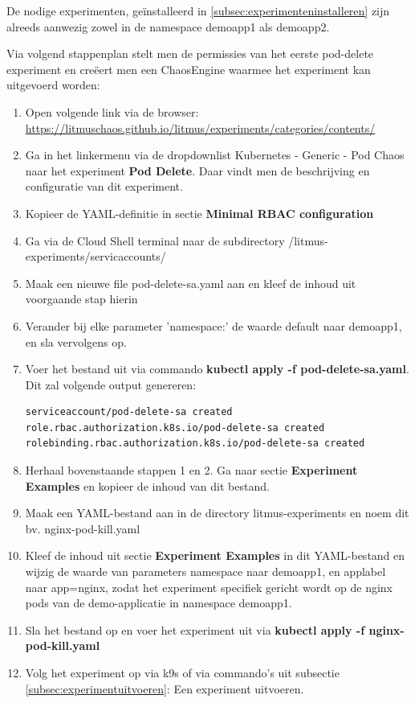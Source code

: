 De nodige experimenten, geïnstalleerd in \ref{subsec:experimenteninstalleren} zijn alreeds aanwezig zowel in de namespace demoapp1 als demoapp2.
  
Via volgend stappenplan stelt men de permissies van het eerste pod-delete experiment en creëert men een ChaosEngine waarmee het experiment kan uitgevoerd worden: 
\begin{enumerate}
    \item Open volgende link via de browser: \url{https://litmuschaos.github.io/litmus/experiments/categories/contents/} 
    \item Ga in het linkermenu via de dropdownlist Kubernetes - Generic - Pod Chaos naar het experiment {\bf Pod Delete}. Daar vindt men de beschrijving en configuratie van dit experiment.
    \item Kopieer de YAML-definitie in sectie {\bf Minimal RBAC configuration}
    \item Ga via de Cloud Shell terminal naar de subdirectory /litmus-experiments/servicaccounts/
    \item Maak een nieuwe file pod-delete-sa.yaml aan en kleef de inhoud uit voorgaande stap hierin
    \item Verander bij elke parameter 'namespace:' de waarde default naar demoapp1, en sla vervolgens op.
    \item Voer het bestand uit via commando {\bf kubectl apply -f pod-delete-sa.yaml}. Dit zal volgende output genereren:
\begin{lstlisting}[language=bash]    
serviceaccount/pod-delete-sa created
role.rbac.authorization.k8s.io/pod-delete-sa created
rolebinding.rbac.authorization.k8s.io/pod-delete-sa created
\end{lstlisting}
    \item Herhaal bovenstaande stappen 1 en 2. Ga naar sectie {\bf Experiment Examples} en kopieer de inhoud van dit bestand.
    \item Maak een YAML-bestand aan in de directory litmus-experiments en noem dit bv. nginx-pod-kill.yaml
    \item Kleef de inhoud uit sectie {\bf Experiment Examples} in dit YAML-bestand en wijzig  de waarde van parameters namespace naar demoapp1, en applabel naar app=nginx, zodat het experiment specifiek gericht wordt op de nginx pods van de demo-applicatie in namespace demoapp1.
    \item Sla het bestand op en voer het experiment uit via {\bf kubectl apply -f nginx-pod-kill.yaml}
    \item Volg het experiment op via k9s of via commando's uit subsectie \ref{subsec:experimentuitvoeren}: Een experiment uitvoeren.
\end{enumerate}

